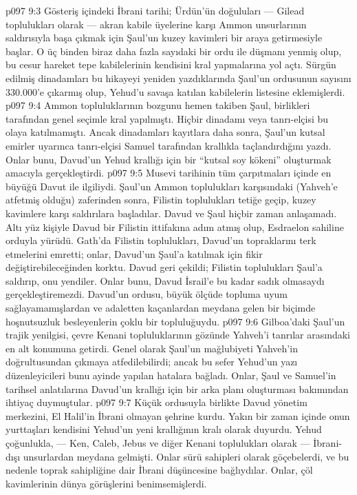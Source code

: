 \vs p097 9:3 Gösteriş içindeki İbrani tarihi; Ürdün’ün doğuluları --- Gilead toplulukları olarak --- akran kabile üyelerine karşı Ammon unsurlarının saldırısıyla başa çıkmak için Şaul’un kuzey kavimleri bir araya getirmesiyle başlar. O üç binden biraz daha fazla sayıdaki bir ordu ile düşmanı yenmiş olup, bu cesur hareket tepe kabilelerinin kendisini kral yapmalarına yol açtı. Sürgün edilmiş dinadamları bu hikayeyi yeniden yazdıklarında Şaul’un ordusunun sayısını 330.000’e çıkarmış olup, Yehud’u savaşa katılan kabilelerin listesine eklemişlerdi.
\vs p097 9:4 Ammon topluluklarının bozgunu hemen takiben Şaul, birlikleri tarafından genel seçimle kral yapılmıştı. Hiçbir dinadamı veya tanrı\hyp{}elçisi bu olaya katılmamıştı. Ancak dinadamları kayıtlara daha sonra, Şaul’un kutsal emirler uyarınca tanrı\hyp{}elçisi Samuel tarafından krallıkla taçlandırdığını yazdı. Onlar bunu, Davud’un Yehud krallığı için bir “kutsal soy kökeni” oluşturmak amacıyla gerçekleştirdi.
\vs p097 9:5 Musevi tarihinin tüm çarpıtmaları içinde en büyüğü Davut ile ilgiliydi. Şaul’un Ammon toplulukları karşısındaki (Yahveh’e atfetmiş olduğu) zaferinden sonra, Filistin toplulukları tetiğe geçip, kuzey kavimlere karşı saldırılara başladılar. Davud ve Şaul hiçbir zaman anlaşamadı. Altı yüz kişiyle Davud bir Filistin ittifakına adım atmış olup, Esdraelon sahiline orduyla yürüdü. Gath’da Filistin toplulukları, Davud’un topraklarını terk etmelerini emretti; onlar, Davud’un Şaul’a katılmak için fikir değiştirebileceğinden korktu. Davud geri çekildi; Filistin toplulukları Şaul’a saldırıp, onu yendiler. Onlar bunu, Davud İsrail’e bu kadar sadık olmasaydı gerçekleştiremezdi. Davud’un ordusu, büyük ölçüde topluma uyum sağlayamamışlardan ve adaletten kaçanlardan meydana gelen bir biçimde hoşnutsuzluk besleyenlerin çoklu bir topluluğuydu.
\vs p097 9:6 Gilboa’daki Şaul’un trajik yenilgisi, çevre Kenani topluluklarının gözünde Yahveh’i tanrılar arasındaki en alt konumuna getirdi. Genel olarak Şaul’un mağlubiyeti Yahveh’in doğrultusundan çıkmaya atfedilebilirdi; ancak bu sefer Yehud’un yazı düzenleyicileri bunu ayinde yapılan hatalara bağladı. Onlar, Şaul ve Samuel’in tarihsel anlatılarına Davud’un krallığı için bir arka planı oluşturması bakımından ihtiyaç duymuştular.
\vs p097 9:7 Küçük ordusuyla birlikte Davud yönetim merkezini, El Halil’in İbrani olmayan şehrine kurdu. Yakın bir zaman içinde onun yurttaşları kendisini Yehud’un yeni krallığının kralı olarak duyurdu. Yehud çoğunlukla, --- Ken, Caleb, Jebus ve diğer Kenani toplulukları olarak --- İbrani\hyp{}dışı unsurlardan meydana gelmişti. Onlar sürü sahipleri olarak göçebelerdi, ve bu nedenle toprak sahipliğine dair İbrani düşüncesine bağlıydılar. Onlar, çöl kavimlerinin dünya görüşlerini benimsemişlerdi.
